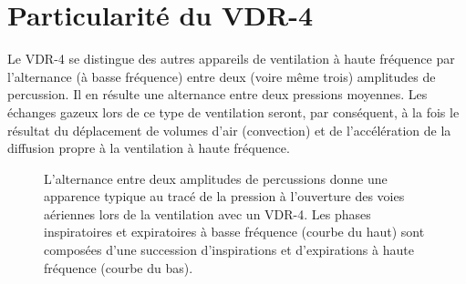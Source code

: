 \section{Particularité du VDR-4}
\label{sec:particularite}
Le VDR-4 se distingue des autres appareils de ventilation à haute fréquence par l’alternance (à basse fréquence) entre deux (voire même trois) amplitudes de percussion. Il en résulte une alternance entre deux pressions moyennes. Les échanges gazeux lors de ce type de ventilation seront, par conséquent, à la fois le résultat du déplacement de volumes d’air (convection) et de l’accélération de la diffusion propre à la ventilation à haute fréquence.

\begin{figure}
	
	\caption{L’alternance entre deux amplitudes de percussions donne une apparence typique au tracé de la pression à l'ouverture des voies aériennes lors de la ventilation avec un VDR-4. Les phases inspiratoires et expiratoires à basse fréquence (courbe du haut) sont composées d’une succession d’inspirations et d’expirations à haute fréquence (courbe du bas).}
\end{figure}

